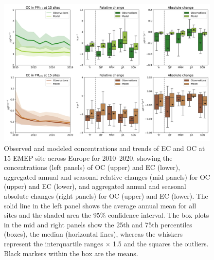 \begin{figure}
\includegraphics[width=16cm]{FIGS_TRENDS/ECOC_trends.png}
\caption{Observed and modeled concentrations and trends of EC and OC at 15 EMEP
  site across Europe for 2010--2020, showing the concentrations
  (left panels) of OC (upper) and EC (lower), aggregated annual and
  seasonal relative changes (mid panels) for OC (upper) and EC (lower),
  and aggregated annual and seasonal absolute changes (right panels)
  for OC (upper) and EC (lower). The solid line in the left panel shows
  the average annual mean for all sites and the shaded area the 95\%
  confidence interval. The box plots in the mid and right panels show
  the 25th and 75th percentiles (boxes), the median (horizontal lines),
  whereas the whiskers represent the interquartile ranges $\times$
  1.5 and the squares the outliers. Black markers within the box are
  the means.\label{fig:KEX1}
}
\end{figure}

